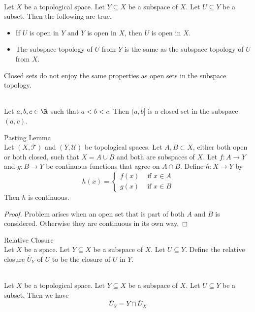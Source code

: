 \documentclass[a4paper]{article}
\begin{document}
\begin{prp}{}{}\\
Let $X$ be a topological space. Let $Y\subseteq X$ be a subspace of $X$. Let $U\subseteq Y$ be a subset. Then the following are true.
\begin{itemize}
\item If $U$ is open in $Y$ and $Y$ is open in $X$, then $U$ is open in $X$. 
\item The subspace topology of $U$ from $Y$ is the same as the subspace topology of $U$ from $X$. 
\end{itemize}
\end{prp}

Closed sets do not enjoy the same properties as open sets in the subspace topology. 

\begin{eg}{}{}\\
Let $a,b,c\in\R$ such that $a<b<c$. Then $(a,b]$ is a closed set in the subspace $(a,c)$. 
\end{eg}

\begin{lmm}{Pasting Lemma}{}\\
Let $(X,\mathcal{T})$ and $(Y,\mathcal{U})$ be topological spaces. Let $A,B\subset X$, either both open or both closed, such that $X=A\cup B$ and both are subspaces of $X$. Let $f:A\to Y$ and $g:B\to Y$ be continuous functions that agree on $A\cap B$. Define $h:X\to Y$ by $$h(x)=\begin{cases}
f(x) & \text{ if }x\in A\\
g(x) & \text{ if }x\in B
\end{cases}$$ Then $h$ is continuous. 
\begin{proof}
Problem arises when an open set that is part of both $A$ and $B$ is considered. Otherwise they are continuous in its own way. 
\end{proof}
\end{lmm}

\begin{defn}{Relative Closure}{}\\
Let $X$ be a space. Let $Y\subseteq X$ be a subspace of $X$. Let $U\subseteq Y$. Define the relative closure $\overline{U}_Y$ of $U$ to be the closure of $U$ in $Y$. 
\end{defn}

\begin{prp}{}{}\\
Let $X$ be a topological space. Let $Y\subseteq X$ be a subspace of $X$. Let $U\subseteq Y$ be a subset. Then we have $$\overline{U}_Y=Y\cap\overline{U}_X$$
\end{prp}
\end{document}

